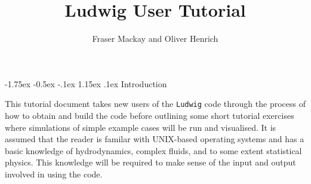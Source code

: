 \documentclass[11pt,twoside,a4paper]{article}
\begin{document}
\setcounter{page}{1}


\newpage
\lstset{style=terminalverbatim}

\setcounter{page}{1}


\makeatletter
\renewcommand*{\section}{%
\@startsection {section}{1}{\z@}%
  {-1.75ex \@plus -0.5ex \@minus -.1ex}%
  {1.15ex \@plus.1ex}%
  {\normalfont\Large\bfseries}%
}
\renewcommand*{\subsection}{%
\@startsection {subsection}{2}{\z@}%
  {-1.75ex \@plus -0.5ex \@minus -.1ex}%
  {1.15ex \@plus.1ex}%
  {\normalfont\large\bfseries}%
}
\renewcommand*{\subsubsection}{%
\@startsection {subsubsection}{1}{\z@}%
  {-1.75ex \@plus -0.5ex \@minus -.1ex}%
  {1.15ex \@plus.1ex}%
  {\normalfont\normalsize\bfseries}%
}

\title{Ludwig User Tutorial}
\author{Fraser Mackay and Oliver Henrich}
\maketitle 
\tableofcontents
\clearpage


\section{Introduction}

This tutorial document takes new users of the \texttt{Ludwig} code through the process of how to obtain 
and build the code before outlining some short tutorial exercises where simulations 
of simple example cases will be run and visualised.
It is assumed that the reader is familar with UNIX-based operating systems and has 
a basic knowledge of hydrodynamics, complex fluids, and to some extent statistical physics. 
This knowledge will be required to make sense of the input and output involved in using the code. 
\end{document}
